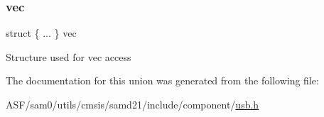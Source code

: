 \subsubsection{\texorpdfstring{vec}{vec}}
{\footnotesize\ttfamily struct \{ ... \}   vec}

Structure used for vec access 

The documentation for this union was generated from the following file\+:\begin{DoxyCompactItemize}
\item 
A\+S\+F/sam0/utils/cmsis/samd21/include/component/\mbox{\hyperlink{component_2usb_8h}{usb.\+h}}\end{DoxyCompactItemize}
